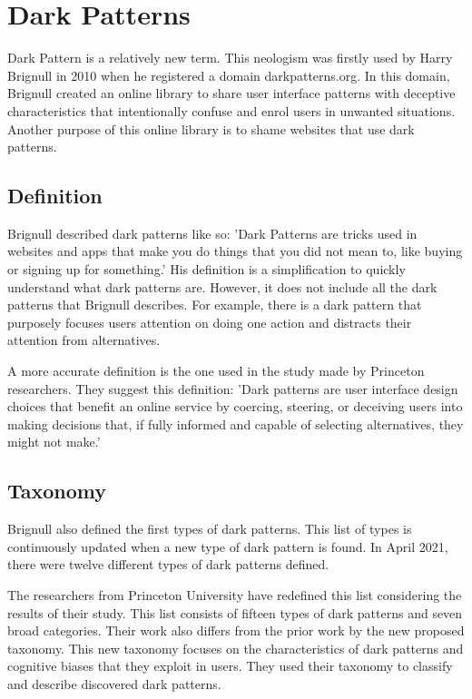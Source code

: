 \chapter{Dark Patterns}
Dark Pattern is a relatively new term. This neologism was firstly used by Harry Brignull in 2010\cite{dark-patterns-arstechnica} when he registered a domain darkpatterns.org. In this domain, Brignull created an online library to share user interface patterns with deceptive characteristics that intentionally confuse and enrol users in unwanted situations. Another purpose of this online library is to shame websites that use dark patterns.

\section{Definition}
Brignull described dark patterns like so: 'Dark Patterns are tricks used in websites and apps that make you do things that you did not mean to, like buying or signing up for something.'\cite{dark-patterns-brignull} His definition is a simplification to quickly understand what dark patterns are. However, it does not include all the dark patterns that Brignull describes. For example, there is a dark pattern that purposely focuses users attention on doing one action and distracts their attention from alternatives.

A more accurate definition is the one used in the study made by Princeton researchers. They suggest this definition: 'Dark patterns are user interface design choices that benefit an online service by coercing, steering, or deceiving users into making decisions that, if fully informed and capable of selecting alternatives, they might not make.' \cite{dark-patterns-at-scale}
\section{Taxonomy}

Brignull also defined the first types of dark patterns. This list of types is continuously updated when a new type of dark pattern is found. In April 2021, there were twelve different types of dark patterns defined\cite{dark-patterns-brignull-types}.

The researchers from Princeton University have redefined this list considering the results of their study. This list consists of fifteen types of dark patterns and seven broad categories. Their work also differs from the prior work\cite{dark-patterns-brignull}\cite{taxonomies-tales}\cite{taxonomies-conti} by the new proposed taxonomy. This new taxonomy focuses on the characteristics of dark patterns and cognitive biases that they exploit in users. They used their taxonomy to classify and describe discovered dark patterns.


